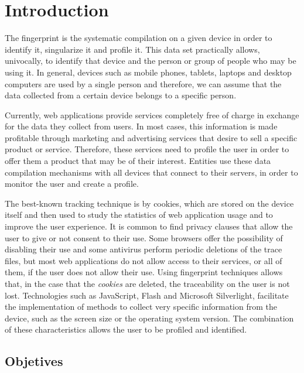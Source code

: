 \chapter{Introduction}

The fingerprint is the systematic compilation on a given device in order to identify it, singularize it and profile it. This data set practically allows, univocally, to identify that device and the person or group of people who may be using it. In general, devices such as mobile phones, tablets, laptops and desktop computers are used by a single person and therefore, we can assume that the data collected from a certain device belongs to a specific person. \par

Currently, web applications provide services completely free of charge in exchange for the data they collect from users. In most cases, this information is made profitable through marketing and advertising services that desire to sell a specific product or service. Therefore, these services need to profile the user in order to offer them a product that may be of their interest. Entities use these data compilation mechanisms with all devices that connect to their servers, in order to monitor the user and create a profile. \par

The best-known tracking technique is by cookies, which are stored on the device itself and then used to study the statistics of web application usage and to improve the user experience. It is common to find privacy clauses that allow the user to give or not consent to their use. Some browsers offer the possibility of disabling their use and some antivirus perform periodic deletions of the trace files, but most web applications do not allow access to their services, or all of them, if the user does not allow their use. Using fingerprint techniques allows that, in the case that the \textit{cookies} are deleted, the traceability on the user is not lost. Technologies such as JavaScript, Flash and Microsoft Silverlight, facilitate the implementation of methods to collect very specific information from the device, such as the screen size or the operating system version. The combination of these characteristics allows the user to be profiled and identified. \par

\section{Objetives}
 

